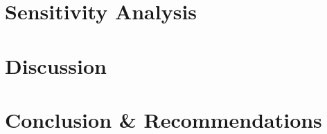 \documentclass[11pt, letterpaper]{article}
\begin{document}
\section{Sensitivity Analysis} \label{sensitivity}


\section{Discussion} \label{discussion}


\section{Conclusion \& Recommendations} \label{conclusion}

\end{document}
